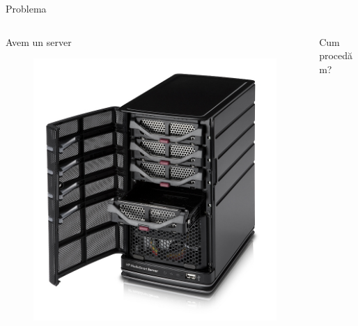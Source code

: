 \documentclass{training}
\begin{document}
\begin{frame}{Problema}
  \begin{columns}
    \pause
    \begin{column}{0.45\textwidth}
      \begin{center}
        Avem un server
      \end{center}
      \begin{figure}
         \includegraphics[scale=0.17]{img/hp-server.jpg}
      \end{figure}
    \end{column}
    \pause
    \begin{column}{0.45\textwidth}
      \begin{center}
      Cum procedăm?
      \end{center}
      \begin{figure}

\end{figure}
\end{column}
\end{columns}
\end{frame}
\end{document}
